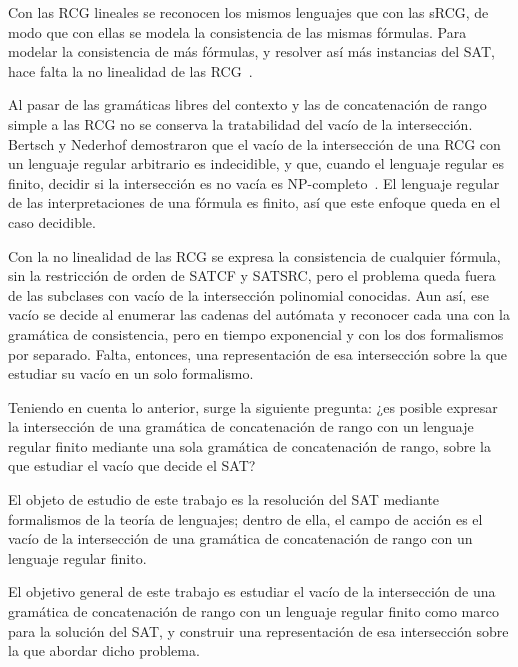 Con las RCG lineales se reconocen los mismos lenguajes que con las sRCG,
de modo que con ellas se modela la consistencia de las mismas fórmulas.
Para modelar la consistencia de más fórmulas, y resolver así más
instancias del SAT, hace falta la no linealidad de las RCG~\cite{boullier1998proposal}.

Al pasar de las gramáticas libres del contexto y las de concatenación
de rango simple a las RCG no se conserva la tratabilidad del vacío de la
intersección. Bertsch y Nederhof demostraron que el vacío de la
intersección de una RCG con un lenguaje regular arbitrario es
indecidible, y que, cuando el lenguaje regular es finito, decidir si la
intersección es no vacía es NP-completo~\cite{bertsch2001rcg}. El
lenguaje regular de las interpretaciones de una fórmula es finito, así
que este enfoque queda en el caso decidible.

Con la no linealidad de las
RCG se expresa la consistencia de cualquier fórmula,
sin la restricción de orden de SATCF y SATSRC, pero el problema queda
fuera de las subclases con vacío de la intersección polinomial conocidas.
Aun así, ese vacío se decide al enumerar las cadenas del autómata y
reconocer cada una con la gramática de consistencia, pero en tiempo
exponencial y con los dos formalismos por separado. Falta, entonces, una
representación de esa intersección sobre la que estudiar su vacío en un
solo formalismo.

Teniendo en cuenta lo anterior, surge la siguiente pregunta:
¿es posible expresar la intersección de una gramática de concatenación de
rango con un lenguaje regular finito mediante una sola gramática de
concatenación de rango, sobre la que estudiar el vacío que decide el SAT?

El objeto de estudio de este trabajo es la resolución del SAT mediante
formalismos de la teoría de lenguajes; dentro de ella, el campo de acción
es el vacío de la intersección de una gramática de concatenación de rango
con un lenguaje regular finito.

El objetivo general de este trabajo es estudiar el vacío de la
intersección de una gramática de concatenación de rango con un lenguaje
regular finito como marco para la solución del SAT, y construir una
representación de esa intersección sobre la que abordar dicho problema.

